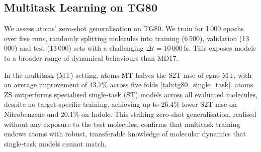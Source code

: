 \subsection{Multitask Learning on TG80}
We assess \gls{atoms}' zero‐shot generalisation on TG80. We train for 1\,000 epochs over five runs, randomly splitting molecules into training (6\,500), validation (13\,000) and test (13\,000) sets with a challenging $\Delta t = 10\, 000\,$fs. This exposes models to a broader range of dynamical behaviours than MD17.

In the multitask (MT) setting, \gls{atoms} MT halves the S2T \gls{mse} of \gls{egno} MT, with an average improvement of $43.7\%$ across five folds \cref{tab:tg80_single_task}. \gls{atoms} ZS outperforms specialised single‐task (ST) models across all evaluated molecules, despite no target‐specific training, achieving up to $26.4\%$ lower S2T \gls{mse} on Nitrobenzene and $20.1\%$ on Indole. This striking zero‐shot generalisation, realised without any exposure to the test molecules, confirms that multitask training endows \gls{atoms} with robust, transferable knowledge of molecular dynamics that single‐task models cannot match.

